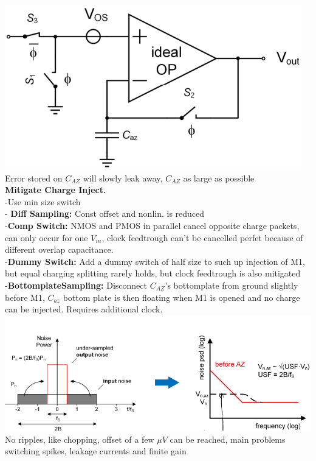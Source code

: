 \documentclass[5pt,landscape]{article}
\begin{document}
\begin{multicols*}{5}
\includegraphics[width=\columnwidth]{images/auto_zero_analog_imp.png}\\
Error stored on $ C_{AZ} $ will slowly leak away, $ C_{AZ} $ as large as possible\\
\textbf{Mitigate Charge Inject.}\\
-Use min size switch\\
- \textbf{Diff Sampling:} Const offset and nonlin. is reduced\\
-\textbf{Comp Switch:} NMOS and PMOS in parallel cancel opposite charge packets, can only occur for one $ V_{in} $, clock feedtrough can't be cancelled perfet because of different overlap capacitance.\\
-\textbf{Dummy Switch:} Add a dummy switch of half size to such up injection of M1, but equal charging splitting rarely holds, but clock feedtrough is also mitigated\\
-\textbf{BottomplateSampling:} Disconnect $ C_{AZ} $'s bottomplate from ground slightly before M1, $ C_{az} $ bottom plate is then floating when M1 is opened and no charge can be injected. Requires additional clock.\\
\includegraphics[width=\columnwidth]{images/az_outcome.png}\\
No ripples, like chopping, offset of a few $ \mu V $ can be reached, main problems switching spikes, leakage currents and finite gain\\

\end{multicols*}
\end{document}
